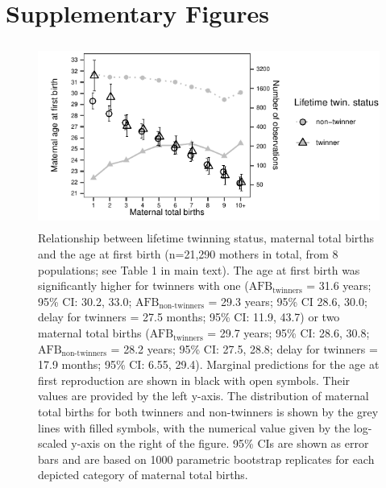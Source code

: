 \documentclass[a4paper]{article}\usepackage[]{graphicx}\usepackage[]{color}
\begin{document}
\pagebreak


\section{Supplementary Figures}

\begin{figure}[H]
\begin{center}
\includegraphics[height = 6cm]{../figures/figS1.pdf}
\end{center}
\caption{Relationship between lifetime twinning status, maternal total births and the age at first birth (n=21,290 mothers in total, from 8 populations; see Table 1 in main text). The age at first birth was significantly higher for twinners with one ($\textrm{AFB}_\textrm{twinners}$ = 31.6 years; 95\% CI: 30.2, 33.0; $\textrm{AFB}_\textrm{non-twinners}$ = 29.3 years; 95\% CI 28.6, 30.0; delay for twinners = 27.5 months; 95\% CI: 11.9, 43.7) or two maternal total births ($\textrm{AFB}_\textrm{twinners}$ = 29.7 years; 95\% CI: 28.6, 30.8; $\textrm{AFB}_\textrm{non-twinners}$ = 28.2 years; 95\% CI: 27.5, 28.8; delay for twinners = 17.9 months; 95\% CI: 6.55, 29.4). Marginal predictions for the age at first reproduction are shown in black with open symbols. Their values are provided by the left y-axis. The distribution of maternal total births for both twinners and non-twinners is shown by the grey lines with filled symbols, with the numerical value given by the log-scaled y-axis on the right of the figure. 95\% CIs are shown as error bars and are based on 1000 parametric bootstrap replicates for each depicted category of maternal total births.}
\end{figure}
\end{document}
